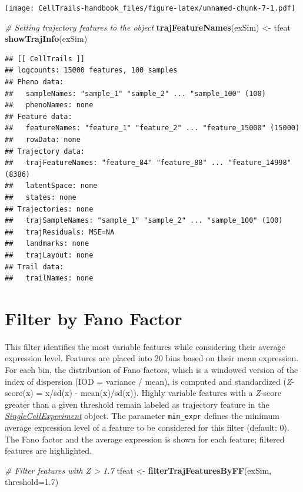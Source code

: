 \documentclass[]{book}
\newenvironment{Shaded}{\begin{snugshade}}{\end{snugshade}}
\newcommand{\KeywordTok}[1]{\textcolor[rgb]{0.13,0.29,0.53}{\textbf{#1}}}
\newcommand{\DataTypeTok}[1]{\textcolor[rgb]{0.13,0.29,0.53}{#1}}
\newcommand{\FloatTok}[1]{\textcolor[rgb]{0.00,0.00,0.81}{#1}}
\newcommand{\StringTok}[1]{\textcolor[rgb]{0.31,0.60,0.02}{#1}}
\newcommand{\CommentTok}[1]{\textcolor[rgb]{0.56,0.35,0.01}{\textit{#1}}}
\newcommand{\NormalTok}[1]{#1}
\theoremstyle{definition}
\theoremstyle{definition}
\theoremstyle{definition}
\theoremstyle{remark}
\begin{document}
\texttt{[image: CellTrails-handbook\_files/figure-latex/unnamed-chunk-7-1.pdf]}

\begin{Shaded}
\begin{Highlighting}[]
\CommentTok{# Setting trajectory features to the object}
\KeywordTok{trajFeatureNames}\NormalTok{(exSim) <-}\StringTok{ }\NormalTok{tfeat}
\KeywordTok{showTrajInfo}\NormalTok{(exSim)}
\end{Highlighting}
\end{Shaded}

\begin{verbatim}
## [[ CellTrails ]] 
## logcounts: 15000 features, 100 samples
## Pheno data: 
##   sampleNames: "sample_1" "sample_2" ... "sample_100" (100)
##   phenoNames: none
## Feature data: 
##   featureNames: "feature_1" "feature_2" ... "feature_15000" (15000)
##   rowData: none
## Trajectory data: 
##   trajFeatureNames: "feature_84" "feature_88" ... "feature_14998" (8386)
##   latentSpace: none
##   states: none
## Trajectories: none
##   trajSampleNames: "sample_1" "sample_2" ... "sample_100" (100)
##   trajResiduals: MSE=NA
##   landmarks: none
##   trajLayout: none
## Trail data: 
##   trailNames: none
\end{verbatim}

\section{Filter by Fano Factor}\label{filter-by-fano-factor}

This filter identifies the most variable features while considering
their average expression level. Features are placed into 20 bins based
on their mean expression. For each bin, the distribution of Fano
factors, which is a windowed version of the index of dispersion (IOD =
variance / mean), is computed and standardized (\emph{Z}-score(x) =
x/sd(x) - mean(x)/sd(x)). Highly variable features with a \emph{Z}-score
greater than a given threshold remain labeled as trajectory feature in
the
\emph{\href{http://bioconductor.org/packages/SingleCellExperiment}{SingleCellExperiment}}
object. The parameter \texttt{min\_expr} defines the minimum average
expression level of a feature to be considered for this filter (default:
0). The Fano factor and the average expression is shown for each
feature; filtered features are highlighted.

\begin{Shaded}
\begin{Highlighting}[]
\CommentTok{# Filter features with Z > 1.7}
\NormalTok{tfeat <-}\StringTok{ }\KeywordTok{filterTrajFeaturesByFF}\NormalTok{(exSim, }\DataTypeTok{threshold=}\FloatTok{1.7}\NormalTok{)}
\end{Highlighting}
\end{Shaded}
\end{document}
